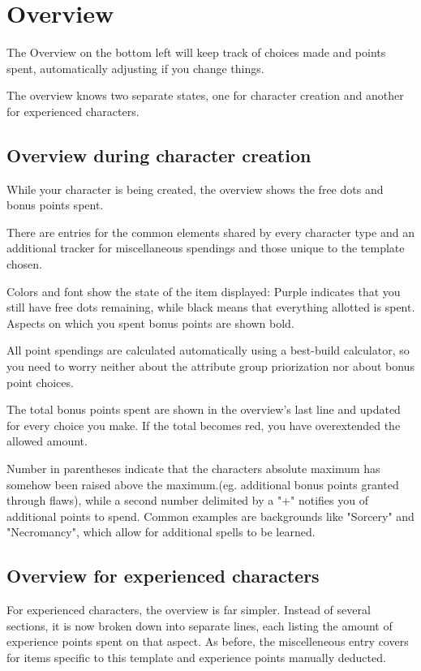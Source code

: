 \section{Overview}
The Overview on the bottom left will keep track of choices made and points spent, automatically adjusting if you change things. 

The overview knows two separate states, one for character creation and another for experienced characters.

\subsection{Overview during character creation}
While your character is being created, the overview shows the free dots and bonus points spent.

There are entries for the common elements shared by every character type and an additional tracker for miscellaneous spendings and those unique to the template chosen.

Colors and font show the state of the item displayed: Purple indicates that you still have free dots remaining, 
while black means that everything allotted is spent. Aspects on which you spent bonus points are shown bold. 

All point spendings are calculated automatically using a best-build calculator, so you need to worry neither about the attribute group priorization nor about bonus point choices.

The total bonus points spent are shown in the overview's last line and updated for every choice you make. If the total becomes red, you have overextended the allowed amount.

Number in parentheses indicate that the characters absolute maximum has somehow been raised above the maximum.(eg. additional bonus points granted through flaws), while a second number delimited by a "+" notifies you of additional points to spend. Common examples are backgrounds like "Sorcery" and "Necromancy", which allow for additional spells to be learned.

\subsection{Overview for experienced characters}
For experienced characters, the overview is far simpler. Instead of several sections, it is now broken down into separate lines, each listing the amount of experience points spent on that aspect. As before, the miscelleneous entry covers for items specific to this template and experience points manually deducted. 

